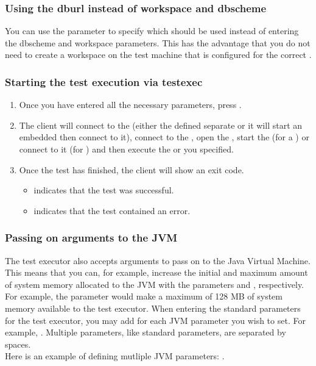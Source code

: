 \subsubsection{Using the dburl instead of workspace and dbscheme}
\label{TasksTestExecDburl}
You can use the  parameter to specify which \gddb{} should be used instead of entering the dbscheme and workspace parameters. This has the advantage that you do not need to create a workspace on the test machine that is configured for the correct \gddb{}.

\subsubsection{Starting the test execution via testexec}
\begin{enumerate}
\item Once you have entered all the necessary parameters, press . 
\item The client will connect to the \gdagent (either the defined separate \gdagent{} or it will start an embedded \gdagent{} then connect to it), connect to the \gddb{}, open the \gdproject{}, start the \gdaut{} (for a \gdsuite{}) or connect to it (for \gdjobs{})  and then execute the \gdsuite{} or \gdjob{} you specified.
\item Once the test has finished, the client will show an exit code.
\begin{itemize}
  \item {} indicates that the test was successful.
  \item {} indicates that the test contained an error.
\end{itemize}
\end{enumerate}

\subsubsection{Passing on arguments to the JVM}
The test executor also accepts arguments to pass on to the Java Virtual Machine. This means that you can, for example, increase the initial and maximum amount of system memory allocated to the JVM with the parameters  and , respectively. For example, the parameter  would make a maximum of 128 MB of system memory available to the test executor. When entering the standard parameters for the test executor, you may add  for each JVM parameter you wish to set. For example, . Multiple parameters, like standard parameters, are separated by spaces. \\
Here is an example of defining mutliple JVM parameters: .
